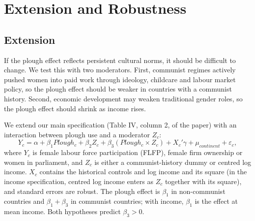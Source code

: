 \documentclass[11pt,a4paper]{article}
\begin{document}
\section{Extension and Robustness}
\subsection{Extension}

If the plough effect reflects persistent cultural norms, it should be difficult to change. We test this with two moderators. First, communist regimes actively pushed women into paid work through ideology, childcare and labour market policy, so the plough effect should be weaker in countries with a communist history. Second, economic development may weaken traditional gender roles, so the plough effect should shrink as income rises.

We extend our main specification (Table IV, column 2, of the paper) with an interaction between plough use and a moderator $Z_c$:
\begin{equation}
    Y_c = \alpha + \beta_1 Plough_c + \beta_2 Z_c + \beta_3 (Plough_c \times Z_c) + X_c'\gamma + \mu_{continent} + \varepsilon_c ,
    \label{eq:extension}
\end{equation}
where $Y_c$ is female labour force participation (FLFP), female firm ownership or women in parliament, and $Z_c$ is either a communist-history dummy or centred log income. $X_c$ contains the historical controls and log income and its square (in the income specification, centred log income enters as $Z_c$ together with its square), and standard errors are robust. The plough effect is $\beta_1$ in non-communist countries and $\beta_1+\beta_3$ in communist countries; with income, $\beta_1$ is the effect at mean income. Both hypotheses predict $\beta_3 > 0$.
\end{document}
